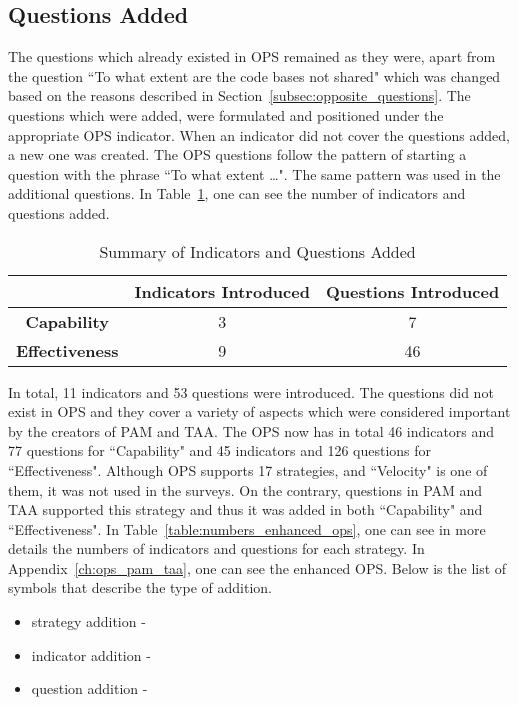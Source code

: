 \subsection{Questions Added}
The questions which already existed in OPS remained as they were, apart from the question ``To what extent are the code bases not shared" which was changed based on the reasons described in Section~\ref{subsec:opposite_questions}. The questions which were added, were formulated and positioned under the appropriate OPS indicator. When an indicator did not cover the questions added, a new one was created. The OPS questions follow the pattern of starting a question with the phrase ``To what extent \dots ". The same pattern was used in the additional questions. In Table~\ref{table:summary_questions_added}, one can see the number of indicators and questions added. 

\begin{table} [H]
	\caption{Summary of Indicators and Questions Added}
	\label{table:summary_questions_added}
	\begin{tabular}{| c | c | c |} \hline
		 & \textbf{Indicators Introduced} & \textbf{Questions Introduced} \\ \hline
		 \textbf{Capability} & 3 & 7 \\ \hline
		 \textbf{Effectiveness} & 9 & 46 \\ \hline
	\end{tabular}
\end{table}

In total, 11 indicators and 53 questions were introduced. The questions did not exist in OPS and they cover a variety of aspects which were considered important by the creators of PAM and TAA. The OPS now has in total 46 indicators and 77 questions for ``Capability" and 45 indicators and 126 questions for ``Effectiveness". Although OPS supports 17 strategies, and ``Velocity" is one of them, it was not used in the surveys. On the contrary, questions in PAM and TAA supported this strategy and thus it was added in both ``Capability" and ``Effectiveness". In Table~\ref{table:numbers_enhanced_ops}, one can see in more details the numbers of indicators and questions for each strategy. In Appendix~\ref{ch:ops_pam_taa}, one can see the enhanced OPS. Below is the list of symbols that describe the type of addition.

\begin{itemize}
	\item strategy addition - \TwelweStar
	\item indicator addition - \FiveStarOutline
	\item question addition - \FiveStar
\end{itemize}

